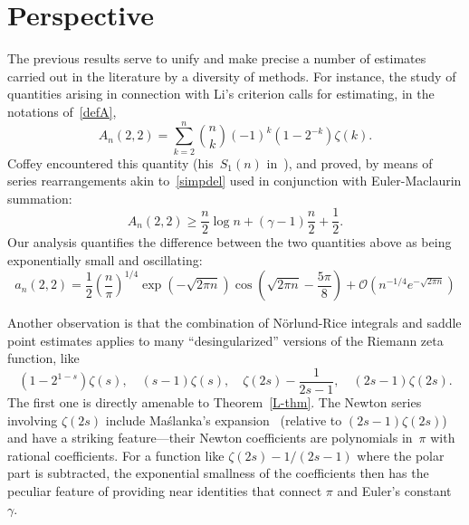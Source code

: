 \documentclass{amsart}
\begin{document}
\section{Perspective}\label{concl-sec}
\smallskip
The previous results serve to
unify and make precise a number of estimates carried out in the literature by a diversity
of methods. For instance, the study of quantities arising in connection with Li's criterion
calls for estimating,  in the notations of~\eqref{defA},
\begin{equation}\label{coffeyS1}
A_n(2,2)=\sum_{k=2}^n \binom{n}{k}(-1)^k(1-2^{-k})\zeta(k).
\end{equation}
Coffey encountered this quantity (his~$S_1(n)$ in~\cite{Coffey05}),
and proved, by means of series rearrangements akin to~\eqref{simpdel}
used in conjunction with Euler-Maclaurin summation:
\begin{equation}\label{coffeyineq}
A_n(2,2) \ge \frac{n}{2}\log n+(\gamma-1)\frac{n}{2}+\frac12.
\end{equation}
Our analysis quantifies  the difference between the two quantities above as
being exponentially small and oscillating:
\begin{equation}
 a_{n}(2,2)=\frac{1}{2}\left(\frac{n}{\pi}\right)^{1/4}
\exp\left(-\sqrt{2\pi n}\right) \cos\left(\sqrt{2\pi n}-\frac{5\pi}{8}\right)
+\mathcal{O}\left(n^{-1/4}e^{-\sqrt{2\pi n}}\right)
\end{equation}

Another observation is that the combination of N\"orlund-Rice integrals
and saddle point estimates applies to many ``desingularized'' versions of 
the Riemann zeta function, like
\[
(1-2^{1-s})\zeta(s), \quad
(s-1)\zeta(s), \quad
\zeta(2s)-\frac{1}{2s-1},\quad
(2s-1)\zeta(2s).
\]
The first one is directly amenable to Theorem~\ref{L-thm}. The
Newton series involving $\zeta(2s)$ include Ma{\'s}lanka's expansion~\cite{Maslanka01}
(relative to $(2s-1)\zeta(2s)$)
and have a striking feature---their Newton coefficients are 
polynomials in~$\pi$ with rational coefficients. 
For a function like $\zeta(2s)-1/(2s-1)$ where the polar part is subtracted,
the exponential smallness of the coefficients
then has the peculiar feature of providing near identities that connect $\pi$ and
Euler's constant~$\gamma$.
\end{document}
